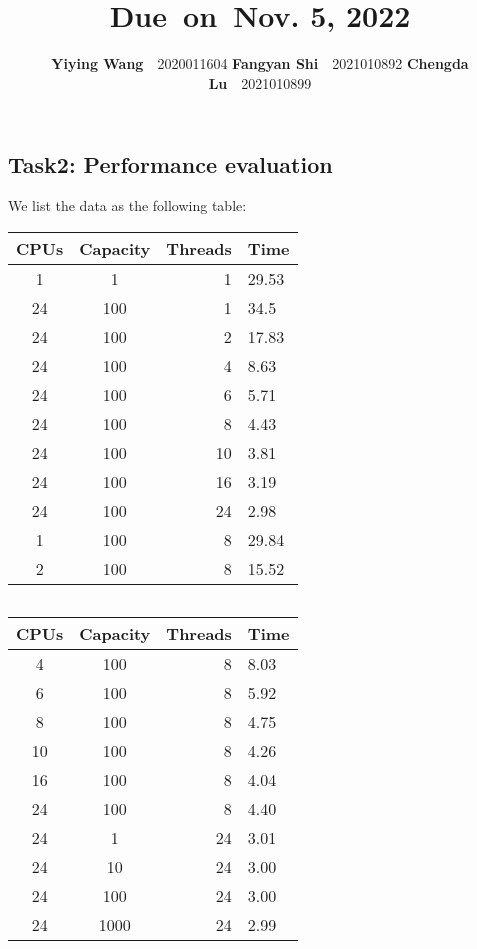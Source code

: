 \documentclass{article}
\title{\textmd{\bf \Class}\\\normalsize\vspace{0.1in}\small{Due\ on\ Nov. 5, 2022}}
\date{}
\author{\textbf{Yiying Wang}\ \ 2020011604 \textbf{Fangyan Shi}\ \ 2021010892  \textbf{Chengda Lu}\ \ 2021010899}
\begin{document}
\begin{spacing}{1.1}
\maketitle \thispagestyle{empty}
\section*{Task2: Performance evaluation}
\indent We list the data as the following table:
\\\begin{tabular}{ccrl} \hline %
\textbf{CPUs} & \textbf{Capacity} & \textbf{Threads} & \textbf{Time}  \\ \hline
1 & 1 & 1 & 29.53 \\\hline
24 & 100 & 1 & 34.5 \\\hline
24 & 100 & 2 & 17.83 \\\hline
24 & 100 & 4 & 8.63 \\\hline
24 & 100 & 6 & 5.71 \\\hline
24 & 100 & 8 & 4.43 \\\hline
24 & 100 & 10 & 3.81 \\\hline
24 & 100 & 16 & 3.19 \\\hline
24 & 100 & 24 & 2.98 \\\hline
1 & 100 & 8 & 29.84 \\\hline
2 & 100 & 8 & 15.52 \\\hline
\end{tabular}
$\ \ \ \ \ \ \ \ \ \ $
\begin{tabular}{ccrl} \hline %
\textbf{CPUs} & \textbf{Capacity} & \textbf{Threads} & \textbf{Time}  \\ \hline
4 & 100 & 8 & 8.03 \\\hline
6 & 100 & 8 & 5.92 \\\hline
8 & 100 & 8 & 4.75 \\\hline
10 & 100 & 8 & 4.26 \\\hline
16 & 100 & 8 & 4.04 \\\hline
24 & 100 & 8 & 4.40 \\\hline
24 & 1 & 24 & 3.01 \\\hline
24 & 10 & 24 & 3.00 \\\hline
24 & 100 & 24 & 3.00 \\\hline
24 & 1000 & 24 & 2.99 \\\hline
\end{tabular}
\\

\end{spacing}
\end{document}
